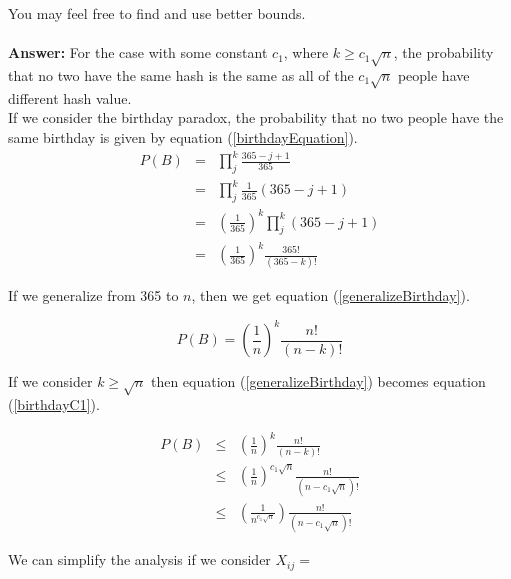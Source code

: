 \documentclass[tikz, 12pt]{scrartcl}
\begin{document}
\begin{enumerate}
	You may feel free to find and use better bounds.\\
	\\
	\textbf{Answer: } For the case with some constant $c_1$, where $k \geq c_1 \sqrt{n}$, the probability that no two have the same hash is the same as all of the $c_1 \sqrt{n}$ people have different hash value.\\
	If we consider the birthday paradox, the probability that no two people have the same birthday is given by equation (\ref{birthdayEquation}).
	\begin{eqnarray}
	P(B) 	&	=	& \prod_{j}^{k}\frac{365 - j + 1}{365} \nonumber\\
		&	=	& \prod_{j}^{k} \frac{1}{365}\left(365 - j + 1 \right) \nonumber \\
		&	=	& \left( \frac{1}{365}\right)^{k} \prod_{j}^{k} \left(365 - j + 1 \right) \nonumber \\
		&	=	& \left( \frac{1}{365}\right)^{k} \frac{365!}{(365 - k)!} \label{birthdayEquation}
	\end{eqnarray}
	
	If we generalize from 365 to $n$, then we get equation (\ref{generalizeBirthday}).
	
	\begin{equation}\label{generalizeBirthday}
	P(B) = \left( \frac{1}{n}\right)^{k} \frac{n!}{(n - k)!} 
	\end{equation}
	
	If we consider $k \geq \sqrt{n}$ then equation (\ref{generalizeBirthday})  becomes equation (\ref{birthdayC1}).
	
	\begin{eqnarray}
	P(B) &	\leq	& \left( \frac{1}{n}\right)^{k} \frac{n!}{(n - k)!} \nonumber \\
		&	\leq	&  \left( \frac{1}{n}\right)^{c_1\sqrt{n}} \frac{n!}{(n - c_1 \sqrt{n})!} \nonumber \\
		&	\leq	&  \left( \frac{1}{ n^{c_1\sqrt{n}} } \right) \frac{n!}{(n - c_1 \sqrt{n})!} \label{birthdayC1} 
	\end{eqnarray}
	
	We can simplify the analysis if we consider $X_{ij} = $
	

\end{enumerate}
\end{document}
